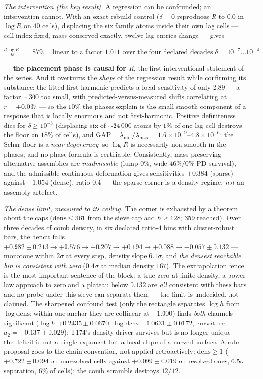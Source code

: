 \documentclass[11pt,a4paper]{article}
\begin{document}
\emph{The intervention (the key result).} A regression can be
confounded; an intervention cannot. With an exact rebuild control
($\delta=0$ reproduces $R$ to $0.0$ in $\log R$ on $40$ cells),
displacing the six family atoms inside their own lag cells --- cell
index fixed, mass conserved exactly, twelve lag entries change ---
gives
\begin{keyeq}$\displaystyle
\frac{d\log R}{d\delta}\;=\;879,\quad\text{linear to a factor }1.011
\text{ over the four declared decades }\delta=10^{-7}\ldots10^{-4}$
\end{keyeq}
\noindent --- \textbf{the placement phase is causal for $R$}, the
first interventional statement of the series. And it overturns the
\emph{shape} of the regression result while confirming its substance:
the fitted first harmonic predicts a local sensitivity of only $2.89$
--- a factor ${\sim}300$ too small, with predicted-versus-measured
shifts correlating at $r=+0.037$ --- so the $10\%$ the phases explain
is the small smooth component of a response that is locally enormous
and not first-harmonic. Positive definiteness dies for
$\delta\ge10^{-3}$ (displacing six of ${\sim}24\,000$ atoms by $1\%$
of one lag cell destroys the floor on $18\%$ of cells), and
$\mathrm{GAP}=\lambda_{\min}/\lambda_{\max}=1.6\times10^{-9}$--$4.8
\times10^{-6}$: the Schur floor is a \emph{near-degeneracy}, so $\log
R$ is necessarily non-smooth in the phases, and no phase formula is
certifiable. Consistently, mass-preserving alternative assemblies are
\emph{inadmissible} (lump $0\%$, wide $46\%/0\%$ PD survival), and the
admissible continuous deformation gives sensitivities $+0.384$
(sparse) against $-1.054$ (dense), ratio $0.4$ --- the sparse corner
is a density regime, \emph{not} an assembly artefact.

\emph{The dense limit, measured to its ceiling.} The corner is
exhausted by a theorem about the caps ($\mathrm{dens}\le361$ from the
sieve cap and $h\ge128$; $359$ reached). Over three decades of comb
density, in six declared ratio-$4$ bins with cluster-robust bars, the
deficit falls
$+0.982\pm0.213\to+0.576\to+0.207\to+0.194\to+0.088\to-0.057\pm0.132$
--- monotone within $2\sigma$ at every step, density slope
$6.1\sigma$, and \emph{the densest reachable bin is consistent with
zero} ($0.4\sigma$ at median density $167$). The extrapolation fence
is the most important sentence of the block: a true zero at finite
density, a power-law approach to zero and a plateau below $0.132$ are
\emph{all} consistent with these bars, and no probe under this sieve
can separate them --- the limit is undecided, not claimed. The
sharpened confound test (only the rectangle separates $\log h$ from
$\log\mathrm{dens}$: within one anchor they are collinear at $-1.000$)
finds \emph{both} channels significant ($\log h$ $+0.2435\pm0.0670$,
$\log\mathrm{dens}$ $-0.0631\pm0.0172$, curvature $a_2=-0.137\pm
0.029$): T174's density driver survives but is no longer unique ---
the deficit is not a single exponent but a local slope of a curved
surface. A rule proposal goes to the chain convention, not applied
retroactively: $\mathrm{dens}\ge1$ ($+0.722\pm0.094$ on unresolved
cells against $+0.099\pm0.019$ on resolved ones, $6.5\sigma$
separation, $6\%$ of cells); the comb scramble destroys $12/12$.
\end{document}
